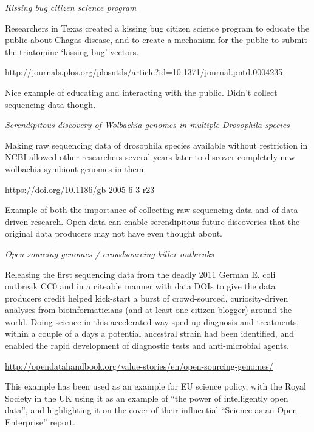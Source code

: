 \documentclass[
]{article}
\begin{document}
\emph{Kissing bug citizen science program}

Researchers in Texas created a kissing bug citizen science program to educate the public about Chagas disease, and to create a mechanism for the public to submit the triatomine `kissing bug' vectors.

\url{http://journals.plos.org/plosntds/article?id=10.1371/journal.pntd.0004235}

Nice example of educating and interacting with the public. Didn't collect sequencing data though.

\emph{Serendipitous discovery of Wolbachia genomes in multiple Drosophila species}

Making raw sequencing data of drosophila species available without restriction in NCBI allowed other researchers several years later to discover completely new wolbachia symbiont genomes in them.

\url{https://doi.org/10.1186/gb-2005-6-3-r23}

Example of both the importance of collecting raw sequencing data and of data-driven research. Open data can enable serendipitous future discoveries that the original data producers may not have even thought about.

\emph{Open sourcing genomes / crowdsourcing killer outbreaks}

Releasing the first sequencing data from the deadly 2011 German E. coli outbreak CC0 and in a citeable manner with data DOIs to give the data producers credit helped kick-start a burst of crowd-sourced, curiosity-driven analyses from bioinformaticians (and at least one citizen blogger) around the world. Doing science in this accelerated way sped up diagnosis and treatments, within a couple of a days a potential ancestral strain had been identified, and enabled the rapid development of diagnostic tests and anti-microbial agents.

\url{http://opendatahandbook.org/value-stories/en/open-sourcing-genomes/}

This example has been used as an example for EU science policy, with the Royal Society in the UK using it as an example of ``the power of intelligently open data'', and highlighting it on the cover of their influential ``Science as an Open Enterprise'' report.

  
\end{document}
